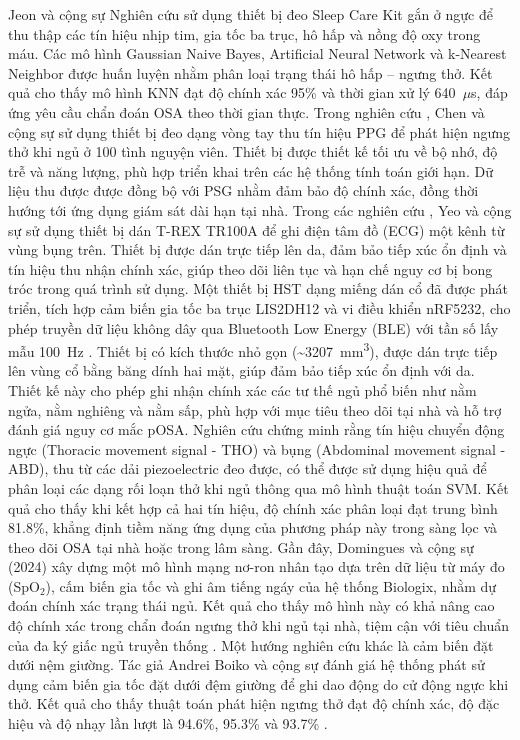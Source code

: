 Jeon và cộng sự \cite{jeon2020realtime} Nghiên cứu sử dụng thiết bị đeo Sleep
Care Kit gắn ở ngực để thu thập các tín hiệu nhịp tim, gia tốc ba trục, hô hấp
và nồng độ oxy trong máu. Các mô hình Gaussian Naive Bayes, Artificial Neural
Network và k-Nearest Neighbor được huấn luyện nhằm phân loại trạng thái hô hấp
– ngưng thở. Kết quả cho thấy mô hình KNN đạt độ chính xác 95\% và thời gian xử
lý 640~$\mu$s, đáp ứng yêu cầu chẩn đoán OSA theo thời gian thực. Trong nghiên
cứu \cite{chen2024hdc}, Chen và cộng sự sử dụng thiết bị đeo dạng vòng tay thu
tín hiệu PPG để phát hiện ngưng thở khi ngủ ở 100 tình nguyện viên. Thiết bị
được thiết kế tối ưu về bộ nhớ, độ trễ và năng lượng, phù hợp triển khai trên
các hệ thống tính toán giới hạn. Dữ liệu thu được được đồng bộ với PSG nhằm đảm
bảo độ chính xác, đồng thời hướng tới ứng dụng giám sát dài hạn tại nhà. Trong
các nghiên cứu \cite{yeo2022resnet, yeo2022respiratory}, Yeo và cộng sự sử dụng
thiết bị dán T-REX TR100A để ghi điện tâm đồ (ECG) một kênh từ vùng bụng trên.
Thiết bị được dán trực tiếp lên da, đảm bảo tiếp xúc ổn định và tín hiệu thu
nhận chính xác, giúp theo dõi liên tục và hạn chế nguy cơ bị bong tróc trong
quá trình sử dụng. Một thiết bị HST dạng miếng dán cổ đã được phát triển, tích
hợp cảm biến gia tốc ba trục LIS2DH12 và vi điều khiển nRF5232, cho phép truyền
dữ liệu không dây qua Bluetooth Low Energy (BLE) với tần số lấy mẫu 100~Hz
\cite{Sleep_Posture_Detection}. Thiết bị có kích thước nhỏ gọn
(\textasciitilde3207~mm\textsuperscript{3}), được dán trực tiếp lên vùng cổ
bằng băng dính hai mặt, giúp đảm bảo tiếp xúc ổn định với da. Thiết kế này cho
phép ghi nhận chính xác các tư thế ngủ phổ biến như nằm ngửa, nằm nghiêng và
nằm sấp, phù hợp với mục tiêu theo dõi tại nhà và hỗ trợ đánh giá nguy cơ mắc
pOSA. Nghiên cứu\cite{svmHSt2017} chứng minh rằng tín hiệu chuyển động ngực
(Thoracic movement signal - THO) và bụng (Abdominal movement signal - ABD), thu
từ các dải piezoelectric đeo được, có thể được sử dụng hiệu quả để phân loại
các dạng rối loạn thở khi ngủ thông qua mô hình thuật toán SVM. Kết quả cho
thấy khi kết hợp cả hai tín hiệu, độ chính xác phân loại đạt trung bình 81.8\%,
khẳng định tiềm năng ứng dụng của phương pháp này trong sàng lọc và theo dõi
OSA tại nhà hoặc trong lâm sàng. Gần đây, Domingues và cộng sự (2024) xây dựng
một mô hình mạng nơ-ron nhân tạo dựa trên dữ liệu từ máy đo (SpO$_2$), cấm biến
gia tốc và ghi âm tiếng ngáy của hệ thống Biologix, nhằm dự đoán chính xác
trạng thái ngủ. Kết quả cho thấy mô hình này có khả nâng cao độ chính xác trong
chẩn đoán ngưng thở khi ngủ tại nhà, tiệm cận với tiêu chuẩn của đa ký giấc ngủ
truyền thống \cite{domingues2024sleep}. Một hướng nghiên cứu khác là cảm biến
đặt dưới nệm giường. Tác giả Andrei Boiko và cộng sự đánh giá hệ thống phát sử
dụng cảm biến gia tốc đặt dưới đệm giường để ghi dao động do cử động ngực khi
thở. Kết quả cho thấy thuật toán phát hiện ngưng thở đạt độ chính xác, độ đặc
hiệu và độ nhạy lần lượt là 94.6\%, 95.3\% và 93.7\% \cite{Boiko2023}.

